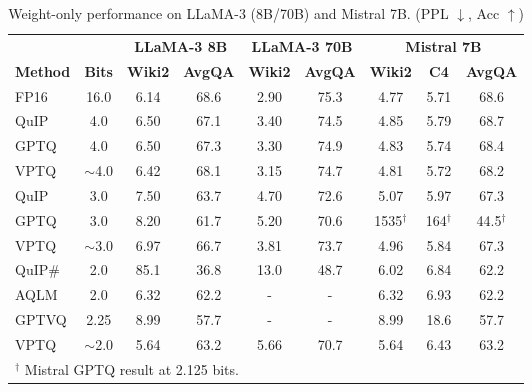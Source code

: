 \begin{table}[htbp]
\centering
\caption{Weight-only performance on LLaMA-3 (8B/70B) and Mistral 7B. (PPL $\downarrow$, Acc $\uparrow$)}
\label{tab:llama3-mistral-merged}
\begin{adjustbox}{max width=\textwidth}
  \begin{tabular}{l|c|cc|cc|ccc}
    \toprule
    & & \multicolumn{2}{c|}{\textbf{LLaMA-3 8B}} & \multicolumn{2}{c|}{\textbf{LLaMA-3 70B}} & \multicolumn{3}{c}{\textbf{Mistral 7B}} \\
    \textbf{Method} & \textbf{Bits} & \textbf{Wiki2} & \textbf{AvgQA} & \textbf{Wiki2} & \textbf{AvgQA} & \textbf{Wiki2} & \textbf{C4} & \textbf{AvgQA} \\
    \midrule
    FP16 & 16.0 & 6.14 & 68.6 & 2.90 & 75.3 & 4.77 & 5.71 & 68.6 \\
    \midrule
    QuIP & 4.0 & 6.50 & 67.1 & 3.40 & 74.5 & 4.85 & 5.79 & 68.7 \\
    GPTQ & 4.0 & 6.50 & 67.3 & 3.30 & 74.9 & 4.83 & 5.74 & 68.4 \\
    VPTQ & $\sim$4.0 & 6.42 & 68.1 & 3.15 & 74.7 & 4.81 & 5.72 & 68.2 \\
    \midrule
    QuIP & 3.0 & 7.50 & 63.7 & 4.70 & 72.6 & 5.07 & 5.97 & 67.3 \\
    GPTQ & 3.0 & 8.20 & 61.7 & 5.20 & 70.6 & 1535$^\dagger$ & 164$^\dagger$ & 44.5$^\dagger$ \\
    VPTQ & $\sim$3.0 & 6.97 & 66.7 & 3.81 & 73.7 & 4.96 & 5.84 & 67.3 \\
    \midrule
    QuIP\# & 2.0 & 85.1 & 36.8 & 13.0 & 48.7 & 6.02 & 6.84 & 62.2 \\
    AQLM & 2.0 & 6.32 & 62.2 & - & - & 6.32 & 6.93 & 62.2 \\
    GPTVQ & 2.25 & 8.99 & 57.7 & - & - & 8.99 & 18.6 & 57.7 \\
    VPTQ & $\sim$2.0 & 5.64 & 63.2 & 5.66 & 70.7 & 5.64 & 6.43 & 63.2 \\
    \bottomrule
    \multicolumn{9}{l}{\footnotesize $^\dagger$ Mistral GPTQ result at 2.125 bits.}
  \end{tabular}
\end{adjustbox}
\end{table}



